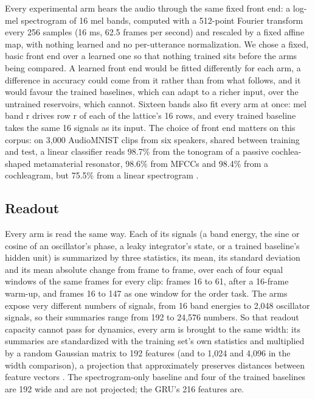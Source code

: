 \documentclass[10pt]{article}
\begin{document}
Every experimental arm hears the audio through the same fixed front end:
a log-mel spectrogram of 16 mel bands, computed with a 512-point Fourier
transform every 256 samples (16 ms, 62.5 frames per second) and rescaled
by a fixed affine map, with nothing learned and no per-utterance
normalization. We chose a fixed, basic front end over a learned one
\citep{zeghidour, lostanlen} so that nothing trained sits before the
arms being compared. A learned front end would be fitted differently for
each arm, a difference in accuracy could come from it rather than from
what follows, and it would favour the trained baselines, which can adapt
to a richer input, over the untrained reservoirs, which cannot. Sixteen
bands also fit every arm at once: mel band r drives row r of each of the
lattice's 16 rows, and every trained baseline takes the same 16 signals
as its input. The choice of front end matters on this corpus: on 3,000
AudioMNIST clips from six speakers, shared between training and test, a
linear classifier reads 98.7\% from the tonogram of a passive
cochlea-shaped metamaterial resonator, 98.6\% from MFCCs and 98.4\% from
a cochleagram, but 75.5\% from a linear spectrogram
\citep{beoletto2026}.

\subsection{Readout}\label{readout}

Every arm is read the same way. Each of its signals (a band energy, the
sine or cosine of an oscillator's phase, a leaky integrator's state, or
a trained baseline's hidden unit) is summarized by three statistics, its
mean, its standard deviation and its mean absolute change from frame to
frame, over each of four equal windows of the same frames for every
clip: frames 16 to 61, after a 16-frame warm-up, and frames 16 to 147 as
one window for the order task. The arms expose very different numbers of
signals, from 16 band energies to 2,048 oscillator signals, so their
summaries range from 192 to 24,576 numbers. So that readout capacity
cannot pass for dynamics, every arm is brought to the same width: its
summaries are standardized with the training set's own statistics and
multiplied by a random Gaussian matrix to 192 features (and to 1,024 and
4,096 in the width comparison), a projection that approximately
preserves distances between feature vectors \citep{johnson1984}. The
spectrogram-only baseline and four of the trained baselines are 192 wide
and are not projected; the GRU's 216 features are.
\end{document}
